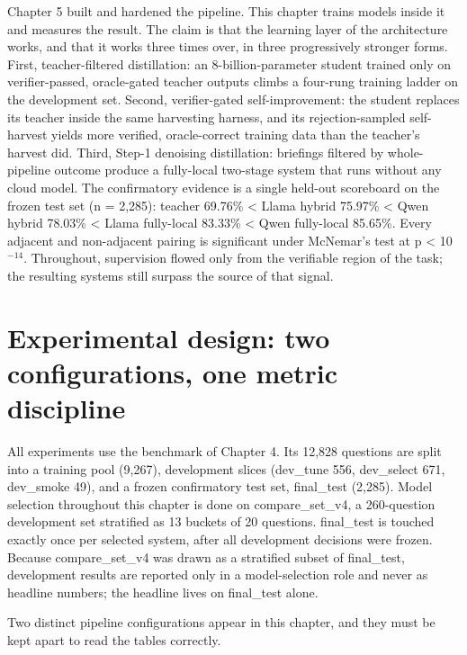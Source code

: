 \documentclass[10pt]{article} %
\begin{document}
Chapter 5 built and hardened the pipeline. This chapter trains models inside it and measures
the result. The claim is that the learning layer of the architecture works, and that it works
three times over, in three progressively stronger forms. First, teacher-filtered distillation:
an 8-billion-parameter student trained only on verifier-passed, oracle-gated teacher outputs
climbs a four-rung training ladder on the development set. Second, verifier-gated
self-improvement: the student replaces its teacher inside the same harvesting harness, and its
rejection-sampled self-harvest yields more verified, oracle-correct training data than the
teacher's harvest did. Third, Step-1 denoising distillation: briefings filtered by
whole-pipeline outcome produce a fully-local two-stage system that runs without any cloud
model. The confirmatory evidence is a single held-out scoreboard on the frozen test set
(n = 2,285): teacher 69.76\% < Llama hybrid 75.97\% < Qwen hybrid 78.03\% < Llama fully-local
83.33\% < Qwen fully-local 85.65\%. Every adjacent and non-adjacent pairing is significant under
McNemar's test at p < 10$^{-14}$. Throughout, supervision flowed only from the verifiable region of
the task; the resulting systems still surpass the source of that signal.

\section{Experimental design: two configurations, one metric discipline}\label{sec:experimental-design-two-configurations-o}

All experiments use the benchmark of Chapter 4. Its 12,828 questions are split into a training
pool (9,267), development slices (dev\_tune 556, dev\_select 671, dev\_smoke 49), and a frozen
confirmatory test set, final\_test (2,285). Model selection throughout this chapter is done on
compare\_set\_v4, a 260-question development set stratified as 13 buckets of 20 questions.
final\_test is touched exactly once per selected system, after all development decisions were
frozen. Because compare\_set\_v4 was drawn as a stratified subset of final\_test, development
results are reported only in a model-selection role and never as headline numbers; the
headline lives on final\_test alone.

Two distinct pipeline configurations appear in this chapter, and they must be kept apart to
read the tables correctly.
\end{document}
